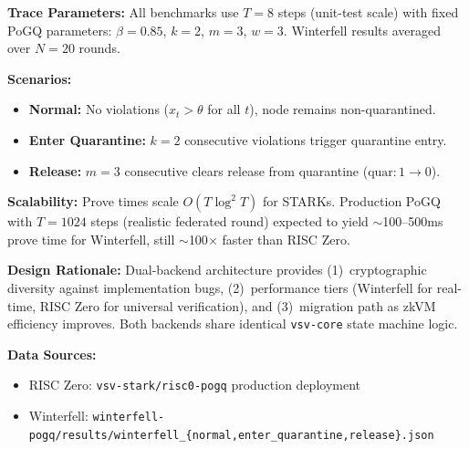\begin{table}[ht]
\begin{tablenotes}
\item \textbf{Trace Parameters:} All benchmarks use $T=8$ steps (unit-test scale) with fixed PoGQ parameters: $\beta=0.85$, $k=2$, $m=3$, $w=3$. Winterfell results averaged over $N=20$ rounds.

\item \textbf{Scenarios:}
\begin{itemize}[leftmargin=*,nosep]
  \item \textbf{Normal:} No violations ($x_t > \theta$ for all $t$), node remains non-quarantined.
  \item \textbf{Enter Quarantine:} $k=2$ consecutive violations trigger quarantine entry.
  \item \textbf{Release:} $m=3$ consecutive clears release from quarantine ($\text{quar}: 1 \rightarrow 0$).
\end{itemize}

\item \textbf{Scalability:} Prove times scale $O(T \log^2 T)$ for STARKs. Production PoGQ with $T=1024$ steps (realistic federated round) expected to yield $\sim$100--500ms prove time for Winterfell, still $\sim$100$\times$ faster than RISC Zero.

\item \textbf{Design Rationale:} Dual-backend architecture provides (1)~cryptographic diversity against implementation bugs, (2)~performance tiers (Winterfell for real-time, RISC Zero for universal verification), and (3)~migration path as zkVM efficiency improves. Both backends share identical \texttt{vsv-core} state machine logic.

\item \textbf{Data Sources:}
\begin{itemize}[leftmargin=*,nosep]
  \item RISC Zero: \texttt{vsv-stark/risc0-pogq} production deployment
  \item Winterfell: \texttt{winterfell-pogq/results/winterfell\_\{normal,enter\_quarantine,release\}.json}
\end{itemize}
\end{tablenotes}
\end{table}

